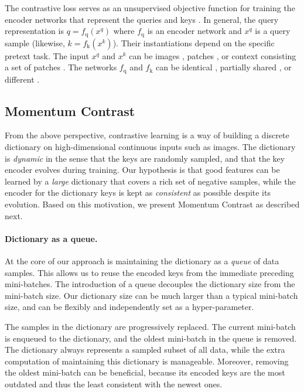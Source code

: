\documentclass[10pt,twocolumn,letterpaper]{article}
\begin{document}
The contrastive loss serves as an unsupervised objective function for training the encoder networks that represent the queries and keys \cite{Hadsell2006}. In general, the query representation is $q=f_\textrm{q}(x^q)$ where $f_\textrm{q}$ is an encoder network and $x^q$ is a query sample (likewise, $k=f_\textrm{k}(x^k)$). 
Their instantiations depend on the specific pretext task.
The input $x^q$ and $x^k$ can be images \cite{Hadsell2006,Wu2018a,Ye2019}, patches \cite{Oord2018}, or context consisting a set of patches \cite{Oord2018}.
The networks $f_\textrm{q}$ and $f_\textrm{k}$ can be identical \cite{Hadsell2006,Wang2015a,Ye2019}, partially shared \cite{Oord2018,Hjelm2019,Bachman2019}, or different \cite{Tian2019}.

\subsection{Momentum Contrast}

From the above perspective, contrastive learning is a way of building a discrete dictionary on high-dimensional continuous inputs such as images. The dictionary is \emph{dynamic} in the sense that the keys are randomly sampled, and that the key encoder evolves during training.
Our hypothesis is that good features can be learned by a \emph{large} dictionary that covers a rich set of negative samples, while the encoder for the dictionary keys is kept as \emph{consistent} as possible despite its evolution. Based on this motivation, we present \mbox{Momentum} Contrast as described next.

\paragraph{Dictionary as a queue.} At the core of our approach is maintaining the dictionary as a \emph{queue} of data samples. This allows us to reuse the encoded keys from the immediate preceding mini-batches. The introduction of a queue  decouples the dictionary size from the mini-batch size. Our dictionary size can be much larger than a typical mini-batch size, and can be flexibly and independently set as a hyper-parameter.

The samples in the dictionary are progressively replaced. The current mini-batch is enqueued to the dictionary, and the oldest mini-batch in the queue is removed. The dictionary always represents a sampled subset of all data, while the extra computation of maintaining this dictionary is manageable. Moreover, removing the oldest mini-batch can be beneficial, because its encoded keys are the most outdated and thus the least consistent with the newest ones.
\end{document}
